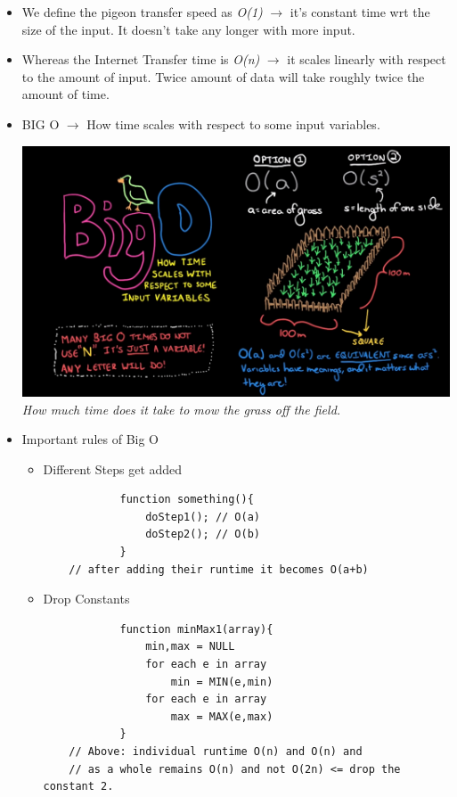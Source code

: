 \documentclass[11pt]{article}
\begin{document}
\begin{enumerate}
\begin{itemize}
            \item We define the pigeon transfer speed as \textit{O(1)} $\rightarrow$ it's constant time wrt the size of the input. It doesn't take any longer with more input.
            \item Whereas the Internet Transfer time is \textit{O(n)} $\rightarrow$ it scales linearly with respect to the amount of input. Twice amount of data will take roughly twice the amount of time.
            \item BIG O $\rightarrow$ How time scales with respect to some input variables.
            \begin{center}
                \includegraphics[width=13cm]{imgs/bigO.png}
                \textit{How much time does it take to mow the grass off the field.}
            \end{center}
            \item Important rules of Big O
            \begin{itemize}
                \item Different Steps get added
                \begin{verbatim}
            function something(){
                doStep1(); // O(a)
                doStep2(); // O(b)
            }
    // after adding their runtime it becomes O(a+b)
                \end{verbatim}
                \item Drop Constants
                \begin{verbatim}
            function minMax1(array){
                min,max = NULL
                for each e in array
                    min = MIN(e,min)
                for each e in array
                    max = MAX(e,max)
            }
    // Above: individual runtime O(n) and O(n) and 
    // as a whole remains O(n) and not O(2n) <= drop the constant 2.


\end{verbatim}
\end{itemize}
\end{itemize}
\end{enumerate}
\end{document}
